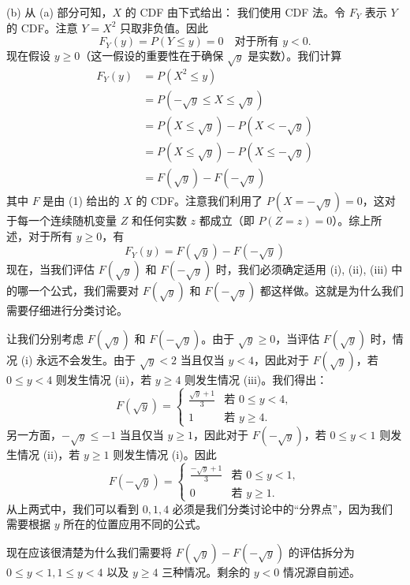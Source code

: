 \begin{questions}
\begin{solution}
(b) 从 (a) 部分可知，$X$ 的 CDF 由下式给出：
我们使用 CDF 法。令 $F_Y$ 表示 $Y$ 的 CDF。注意 $Y = X^2$ 只取非负值。因此
\[
F_Y(y) = P(Y \le y) = 0 \quad \text{对于所有 } y < 0.
\]
现在假设 $y \ge 0$（这一假设的重要性在于确保 $\sqrt{y}$ 是实数）。我们计算
\begin{align*}
F_Y(y) &= P(X^2 \le y) \\
&= P(-\sqrt{y} \le X \le \sqrt{y}) \\
&= P(X \le \sqrt{y}) - P(X < -\sqrt{y}) \\
&= P(X \le \sqrt{y}) - P(X \le -\sqrt{y}) \\
&= F(\sqrt{y}) - F(-\sqrt{y})
\end{align*}
其中 $F$ 是由 (1) 给出的 $X$ 的 CDF。注意我们利用了 $P(X = -\sqrt{y}) = 0$，这对于每一个连续随机变量 $Z$ 和任何实数 $z$ 都成立（即 $P(Z = z) = 0$）。综上所述，对于所有 $y \ge 0$，有
\[
F_Y(y) = F(\sqrt{y}) - F(-\sqrt{y})
\]
现在，当我们评估 $F(\sqrt{y})$ 和 $F(-\sqrt{y})$ 时，我们必须确定适用 (i), (ii), (iii) 中的哪一个公式，我们需要对 $F(\sqrt{y})$ 和 $F(-\sqrt{y})$ 都这样做。这就是为什么我们需要仔细进行分类讨论。

让我们分别考虑 $F(\sqrt{y})$ 和 $F(-\sqrt{y})$。由于 $\sqrt{y} \ge 0$，当评估 $F(\sqrt{y})$ 时，情况 (i) 永远不会发生。由于 $\sqrt{y} < 2$ 当且仅当 $y < 4$，因此对于 $F(\sqrt{y})$，若 $0 \le y < 4$ 则发生情况 (ii)，若 $y \ge 4$ 则发生情况 (iii)。我们得出：
\[
F(\sqrt{y}) = \begin{cases} \frac{\sqrt{y}+1}{3} & \text{若 } 0 \le y < 4, \\ 1 & \text{若 } y \ge 4. \end{cases}
\]
另一方面，$-\sqrt{y} \le -1$ 当且仅当 $y \ge 1$，因此对于 $F(-\sqrt{y})$，若 $0 \le y < 1$ 则发生情况 (ii)，若 $y \ge 1$ 则发生情况 (i)。因此
\[
F(-\sqrt{y}) = \begin{cases} \frac{-\sqrt{y}+1}{3} & \text{若 } 0 \le y < 1, \\ 0 & \text{若 } y \ge 1. \end{cases}
\]
从上两式中，我们可以看到 $0, 1, 4$ 必须是我们分类讨论中的“分界点”，因为我们需要根据 $y$ 所在的位置应用不同的公式。

现在应该很清楚为什么我们需要将 $F(\sqrt{y}) - F(-\sqrt{y})$ 的评估拆分为 $0 \le y < 1, 1 \le y < 4$ 以及 $y \ge 4$ 三种情况。剩余的 $y < 0$ 情况源自前述。


\end{solution}
\end{questions}
